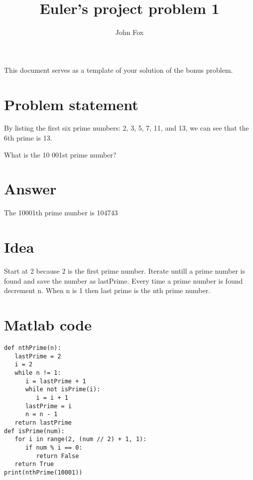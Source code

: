 \documentclass{article}
\title{Euler's project problem 1}
\author{John Fox}
\begin{document}
\maketitle
\large
This document serves as a template of your solution of the bonus problem.\\

\section*{Problem statement} 
By listing the first six prime numbers: 2, 3, 5, 7, 11, and 13, we can see that the 6th prime is 13.

What is the 10 001st prime number?

\section*{Answer}
The 10001th prime number is 104743
\section*{Idea} Start at 2 because 2 is the first prime number. Iterate untill a prime number is found and save the number as lastPrime. Every time a prime number is found decrement n. When n is 1 then last prime is the nth prime number. 

\section*{Matlab code}
\begin{verbatim}
def nthPrime(n):
   lastPrime = 2
   i = 2
   while n != 1:
      i = lastPrime + 1
      while not isPrime(i):
         i = i + 1
      lastPrime = i
      n = n - 1
   return lastPrime
def isPrime(num):
   for i in range(2, (num // 2) + 1, 1):
      if num % i == 0:
         return False
   return True
print(nthPrime(10001))
\end{verbatim}
\end{document}
